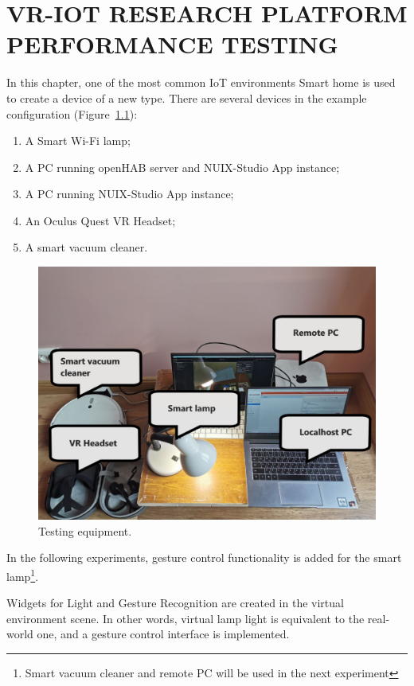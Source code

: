 
\chapter{VR-IOT RESEARCH PLATFORM PERFORMANCE TESTING}

In this chapter, one of the most common IoT environments Smart home is used to create a device of a new type. There are several devices in the example configuration (Figure~\ref{fig:TestingEquipment-figure}):
\begin{enumerate}
    \item A Smart Wi-Fi lamp;
    \item A PC running openHAB server and NUIX-Studio App instance;
    \item A PC running NUIX-Studio App instance;
    \item An Oculus Quest VR Headset;
    \item A smart vacuum cleaner.
\end{enumerate}

\begin{figure}
  \centering
  \includegraphics[width = 0.9 \linewidth]{figures/TestingEquipment.png}
  \caption{Testing equipment.}
  \label{fig:TestingEquipment-figure}
\end{figure}

In the following experiments, gesture control functionality is added for the smart lamp\footnote{Smart vacuum cleaner and remote PC will be used in the next experiment}.

Widgets for Light and Gesture Recognition are created in the virtual environment scene. In other words, virtual lamp light is equivalent to the real-world one, and a gesture control interface is implemented.

